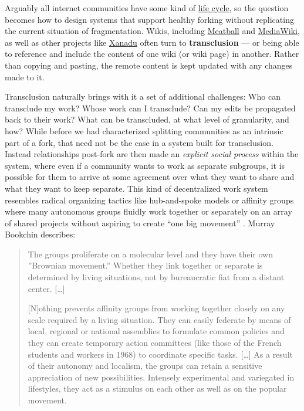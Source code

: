 \documentclass[notoc]{tufte-book}
\begin{document}
Arguably all internet communities have some kind of
\href{http://meatballwiki.org/wiki/WikiLifeCycle}{life cycle}, so the
question becomes how to design systems that support healthy forking
without replicating the current situation of fragmentation. Wikis,
including \href{http://www.meatballwiki.org/wiki/TransClusion}{Meatball}
and
\href{https://www.mediawiki.org/wiki/Extension:Interwiki}{MediaWiki}, as
well as other projects like
\href{https://en.wikipedia.org/wiki/Project_Xanadu}{Xanadu} often turn
to \textbf{transclusion} --- or being able to reference and include the
content of one wiki (or wiki page) in another. Rather than copying and
pasting, the remote content is kept updated with any changes made to it.

Transclusion naturally brings with it a set of additional challenges:
Who can transclude my work? Whose work can I transclude? Can my edits be
propagated back to their work? What can be transcluded, at what level of
granularity, and how? While before we had characterized splitting
communities as an intrinsic part of a fork, that need not be the case in
a system built for transclusion. Instead relationships post-fork are
then made an \emph{explicit social process} within the system, where
even if a community wants to work as separate subgroups, it is possible
for them to arrive at some agreement over what they want to share and
what they want to keep separate. This kind of decentralized work system
resembles radical organizing tactics like hub-and-spoke models or
affinity groups where many autonomous groups fluidly work together or
separately on an array of shared projects without aspiring to create
``one big movement'' \citep{kleinWereDCSeattle2001} . Murray
Bookchin describes:

\begin{quote}
The groups proliferate on a molecular level and they have their own
''Brownian movement.'' Whether they link together or separate is
determined by living situations, not by bureaucratic fiat from a distant
center. {[}\ldots{]}

{[}N{]}othing prevents affinity groups from working together closely on
any scale required by a living situation. They can easily federate by
means of local, regional or national assemblies to formulate common
policies and they can create temporary action committees (like those of
the French students and workers in 1968) to coordinate specific tasks.
{[}\ldots{]} As a result of their autonomy and localism, the groups can
retain a sensitive appreciation of new possibilities. Intensely
experimental and variegated in lifestyles, they act as a stimulus on
each other as well as on the popular movement. \citep{bookchinNoteAffinityGroups1969} 
\end{quote}
\end{document}

